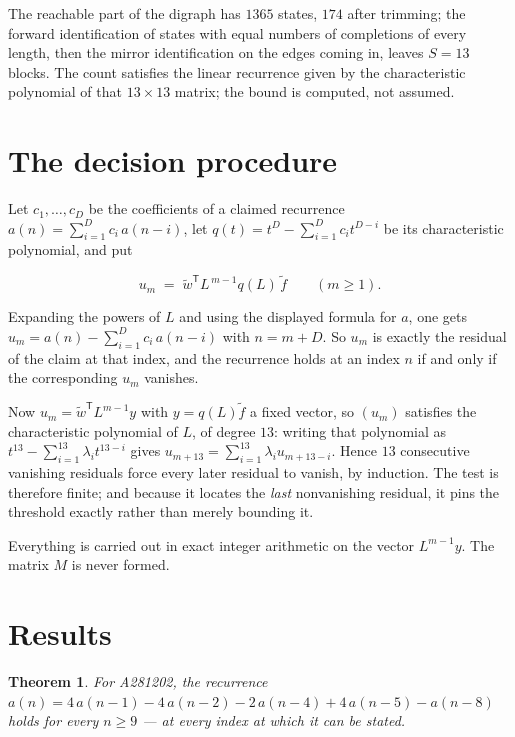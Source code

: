 \documentclass[11pt]{article}
\newtheorem{theorem}{Theorem}
\theoremstyle{definition}
\begin{document}
The reachable part of the digraph has $1365$ states, $174$ after trimming; the forward identification of states with equal numbers of completions of every length, then the mirror identification on the edges coming in, leaves $S = 13$ blocks. The count satisfies the linear recurrence given by the characteristic polynomial of that $13\times13$ matrix; the bound is computed, not assumed.

\section{The decision procedure}

Let $c_1,\dots,c_D$ be the coefficients of a claimed recurrence $a(n) = \sum_{i=1}^{D} c_i\,a(n-i)$, let $q(t) = t^{D} - \sum_{i=1}^{D} c_i t^{D-i}$ be its characteristic polynomial, and put

\[u_m \;=\; \tilde w^{\mathsf T} L^{\,m-1} q(L)\,\tilde f \qquad (m \ge 1).\]

Expanding the powers of $L$ and using the displayed formula for $a$, one gets $u_m = a(n) - \sum_{i=1}^{D} c_i\,a(n-i)$ with $n = m + D$. So $u_m$ is exactly the residual of the claim at that index, and the recurrence holds at an index $n$ if and only if the corresponding $u_m$ vanishes.

Now $u_m = \tilde w^{\mathsf T} L^{m-1} y$ with $y = q(L)\tilde f$ a fixed vector, so $(u_m)$ satisfies the characteristic polynomial of $L$, of degree $13$: writing that polynomial as $t^{13} - \sum_{i=1}^{13} \lambda_i t^{13-i}$ gives $u_{m+13} = \sum_{i=1}^{13} \lambda_i u_{m+13-i}$. Hence $13$ consecutive vanishing residuals force every later residual to vanish, by induction. The test is therefore finite; and because it locates the {\itshape last} nonvanishing residual, it pins the threshold exactly rather than merely bounding it.

Everything is carried out in exact integer arithmetic on the vector $L^{m-1}y$. The matrix $M$ is never formed.

\section{Results}

\begin{theorem} For A281202, the recurrence $a(n) = 4\,a(n-1) - 4\,a(n-2) - 2\,a(n-4) + 4\,a(n-5) - a(n-8)$ holds for every $n \ge 9$ --- at every index at which it can be stated.\end{theorem}
\end{document}
